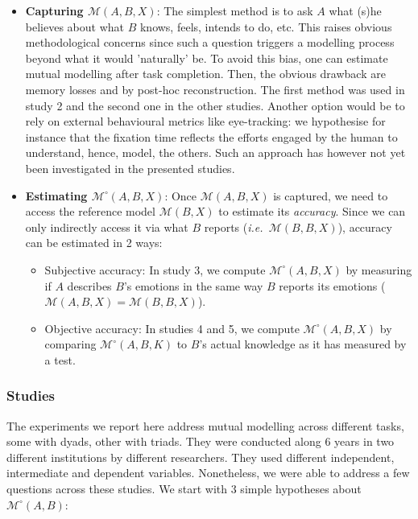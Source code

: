 \documentclass[twocolumn]{article}
\newcommand{\ie}{{\textit{i.e.\ }}}
\newcommand{\M}[3]{{\mathcal{M}(#1, #2, #3)}}
\newcommand{\model}[3]{{$\mathcal{M}(#1, #2, #3)$}}
\newcommand{\refmodel}[2]{{$\mathcal{M}(#1, #2)$}}
\newcommand{\Model}[3]{{$\mathcal{M}^{\circ}(#1, #2, #3)$}}
\begin{document}
\begin{itemize}
    \item {\bf Capturing \model{A}{B}{X}}: The simplest method is to ask $A$ what (s)he
        believes about what $B$ knows, feels, intends to do, etc. This raises
        obvious methodological concerns since such a question triggers a
        modelling process beyond what it would 'naturally' be. To avoid this
        bias, one can estimate mutual modelling after task completion. Then, the
        obvious drawback are memory losses and by post-hoc reconstruction.  The
        first method was used in study 2 and the second one in the other
        studies. Another option would be to rely on external behavioural metrics
        like eye-tracking: we hypothesise for instance that the fixation time
        reflects the efforts engaged by the human to understand, hence, model,
        the others. Such an approach has however not yet been investigated in
        the presented studies.

    \item {\bf Estimating \Model{A}{B}{X}}: Once \model{A}{B}{X} is captured, we
        need to access the reference model \refmodel{B}{X} to estimate its
        \emph{accuracy}. Since we can only indirectly access it via what $B$
        reports (\ie \model{B}{B}{X}), accuracy can be estimated in 2 ways:

        \begin{itemize}

            \item Subjective accuracy: In study 3, we compute
                \Model{A}{B}{X} by measuring if $A$ describes
                $B$'s emotions in the same way $B$ reports its emotions 
                ($\M{A}{B}{X} = \M{B}{B}{X}$).

            \item Objective accuracy: In studies 4 and 5, we compute
                \Model{A}{B}{X} by comparing \Model{A}{B}{K} to $B$'s
                actual knowledge as it has measured by a test.

        \end{itemize}

\end{itemize}


\subsubsection*{Studies}

The experiments we report here address mutual modelling across different tasks,
some with dyads, other with triads. They were conducted along 6 years in two
different institutions by different researchers. They used different
independent, intermediate and dependent variables. Nonetheless, we were able to
address a few questions across these studies. We start with 3 simple hypotheses
about $\mathcal{M}^{\circ}(A,B)$:
\end{document}
